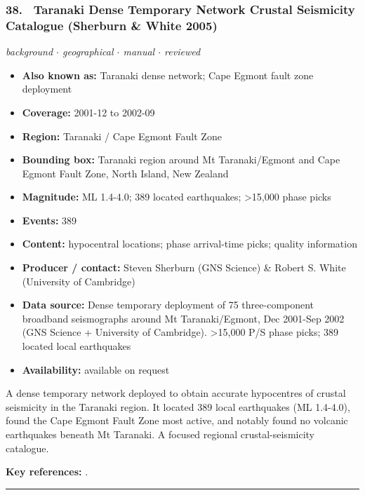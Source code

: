 \documentclass[10pt,a4paper]{article}
\newcommand{\catentryrule}{\par\vspace{3pt}\noindent\textcolor{rulegrey}{\rule{\linewidth}{0.3pt}}\par\vspace{5pt}}
\newcommand{\kv}[2]{\item \textbf{#1:} #2}
\begin{document}
\subsubsection*{\hypertarget{c:38}{38.}~ Taranaki Dense Temporary Network Crustal Seismicity Catalogue (Sherburn \& White 2005)}
{\small\itshape background $\cdot$ geographical $\cdot$ manual $\cdot$ reviewed}\par\vspace{2pt}
\begin{itemize}[leftmargin=1.3em,itemsep=0.6pt,topsep=1pt,parsep=0pt]
\kv{Also known as}{Taranaki dense network; Cape Egmont fault zone deployment}
\kv{Coverage}{2001-12 to 2002-09}
\kv{Region}{Taranaki / Cape Egmont Fault Zone}
\kv{Bounding box}{Taranaki region around Mt Taranaki/Egmont and Cape Egmont Fault Zone, North Island, New Zealand}
\kv{Magnitude}{ML 1.4-4.0; 389 located earthquakes; \textgreater{}15,000 phase picks}
\kv{Events}{389}
\kv{Content}{hypocentral locations; phase arrival-time picks; quality information}
\kv{Producer / contact}{Steven Sherburn (GNS Science) \& Robert S. White (University of Cambridge)}
\kv{Data source}{Dense temporary deployment of 75 three-component broadband seismographs around Mt Taranaki/Egmont, Dec 2001-Sep 2002 (GNS Science + University of Cambridge). \textgreater{}15,000 P/S phase picks; 389 located local earthquakes}
\kv{Availability}{available on request}
\end{itemize}
\par\vspace{2pt}A dense temporary network deployed to obtain accurate hypocentres of crustal seismicity in the Taranaki region. It located 389 local earthquakes (ML 1.4-4.0), found the Cape Egmont Fault Zone most active, and notably found no volcanic earthquakes beneath Mt Taranaki. A focused regional crustal-seismicity catalogue.
\par\vspace{2pt}\textbf{Key references:} \cite{Sherburn2005}.
\catentryrule
\end{document}
